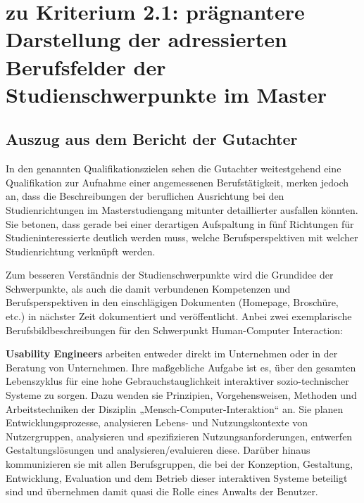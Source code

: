 \section{zu Kriterium 2.1: prägnantere Darstellung der adressierten
Berufsfelder der Studienschwerpunkte im
Master\label{/mi-2017/selbstbericht/stellungnahme/0000-stellungnahme}}\label{zu-kriterium-2.1-pruxe4gnantere-darstellung-der-adressierten-berufsfelder-der-studienschwerpunkte-im-masterpathlabelmi-2017selbstberichtstellungnahme0000-stellungnahme}

\subsection{Auszug aus dem Bericht der
Gutachter\label{/mi-2017/selbstbericht/stellungnahme/0000-stellungnahme}}\label{auszug-aus-dem-bericht-der-gutachterpathlabelmi-2017selbstberichtstellungnahme0000-stellungnahme}

\begin{siderules}
In den genannten Qualifikationszielen sehen die Gutachter weitestgehend
eine Qualifikation zur Aufnahme einer angemessenen Berufstätigkeit,
merken jedoch an, dass die Beschreibungen der beruflichen Ausrichtung
bei den Studienrichtungen im Masterstudiengang mitunter detaillierter
ausfallen könnten. Sie betonen, dass gerade bei einer derartigen
Aufspaltung in fünf Richtungen für Studieninteressierte deutlich werden
muss, welche Berufsperspektiven mit welcher Studienrichtung verknüpft
werden.
\end{siderules}

Zum besseren Verständnis der Studienschwerpunkte wird die Grundidee der
Schwerpunkte, als auch die damit verbundenen Kompetenzen und
Berufsperspektiven in den einschlägigen Dokumenten (Homepage, Broschüre,
etc.) in nächster Zeit dokumentiert und veröffentlicht. Anbei zwei
exemplarische Berufsbildbeschreibungen für den Schwerpunkt
Human-Computer Interaction:

\textbf{Usability Engineers} arbeiten entweder direkt im Unternehmen
oder in der Beratung von Unternehmen. Ihre maßgebliche Aufgabe ist es,
über den gesamten Lebenszyklus für eine hohe Gebrauchstauglichkeit
interaktiver sozio-technischer Systeme zu sorgen. Dazu wenden sie
Prinzipien, Vorgehensweisen, Methoden und Arbeitstechniken der Disziplin
„Mensch-Computer-Interaktion`` an. Sie planen Entwicklungsprozesse,
analysieren Lebens- und Nutzungskontexte von Nutzergruppen, analysieren
und spezifizieren Nutzungsanforderungen, entwerfen Gestaltungslösungen
und analysieren/evaluieren diese. Darüber hinaus kommunizieren sie mit
allen Berufsgruppen, die bei der Konzeption, Gestaltung, Entwicklung,
Evaluation und dem Betrieb dieser interaktiven Systeme beteiligt sind
und übernehmen damit quasi die Rolle eines Anwalts der Benutzer.

